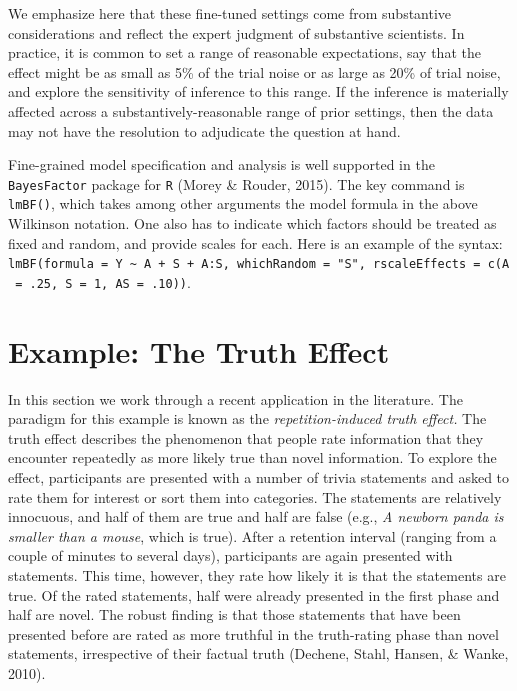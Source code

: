 \documentclass[
  english,
  ,man]{apa6}
\begin{document}
We emphasize here that these fine-tuned settings come from substantive considerations and reflect the expert judgment of substantive scientists. In practice, it is common to set a range of reasonable expectations, say that the effect might be as small as 5\% of the trial noise or as large as 20\% of trial noise, and explore the sensitivity of inference to this range. If the inference is materially affected across a substantively-reasonable range of prior settings, then the data may not have the resolution to adjudicate the question at hand.

Fine-grained model specification and analysis is well supported in the \texttt{BayesFactor} package for \texttt{R} (Morey \& Rouder, 2015). The key command is \texttt{lmBF()}, which takes among other arguments the model formula in the above Wilkinson notation. One also has to indicate which factors should be treated as fixed and random, and provide scales for each. Here is an example of the syntax: \texttt{lmBF(formula\ =\ Y\ \textasciitilde{}\ A\ +\ S\ +\ A:S,\ whichRandom\ =\ "S",\ rscaleEffects\ =\ c(A\ =\ .25,\ S\ =\ 1,\ AS\ =\ .10))}.

\hypertarget{example-the-truth-effect}{%
\section{Example: The Truth Effect}\label{example-the-truth-effect}}

In this section we work through a recent application in the literature. The paradigm for this example is known as the \emph{repetition-induced truth effect.} The truth effect describes the phenomenon that people rate information that they encounter repeatedly as more likely true than novel information. To explore the effect, participants are presented with a number of trivia statements and asked to rate them for interest or sort them into categories. The statements are relatively innocuous, and half of them are true and half are false (e.g., \emph{A newborn panda is smaller than a mouse}, which is true). After a retention interval (ranging from a couple of minutes to several days), participants are again presented with statements. This time, however, they rate how likely it is that the statements are true. Of the rated statements, half were already presented in the first phase and half are novel. The robust finding is that those statements that have been presented before are rated as more truthful in the truth-rating phase than novel statements, irrespective of their factual truth (Dechene, Stahl, Hansen, \& Wanke, 2010).
\end{document}
